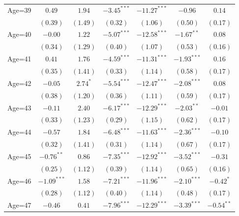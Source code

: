 \documentclass[fullpage]{paper}
\begin{document}
\begin{center}
\begin{longtable}{l c c c c c c }
Age=39      & $0.49$        & $1.94$        & $-3.45^{***}$  & $-11.27^{***}$ & $-0.96$       & $0.14$        \\
            & $(0.39)$      & $(1.49)$      & $(0.32)$       & $(1.06)$       & $(0.50)$      & $(0.17)$      \\
Age=40      & $-0.00$       & $1.22$        & $-5.07^{***}$  & $-12.58^{***}$ & $-1.67^{**}$  & $0.08$        \\
            & $(0.34)$      & $(1.29)$      & $(0.40)$       & $(1.07)$       & $(0.53)$      & $(0.16)$      \\
Age=41      & $0.41$        & $1.76$        & $-4.59^{***}$  & $-11.31^{***}$ & $-1.93^{***}$ & $0.16$        \\
            & $(0.35)$      & $(1.41)$      & $(0.33)$       & $(1.14)$       & $(0.58)$      & $(0.17)$      \\
Age=42      & $-0.05$       & $2.74^{*}$    & $-5.54^{***}$  & $-12.47^{***}$ & $-2.08^{***}$ & $0.08$        \\
            & $(0.38)$      & $(1.20)$      & $(0.36)$       & $(1.11)$       & $(0.59)$      & $(0.17)$      \\
Age=43      & $-0.11$       & $2.40$        & $-6.17^{***}$  & $-12.29^{***}$ & $-2.03^{**}$  & $-0.01$       \\
            & $(0.33)$      & $(1.23)$      & $(0.29)$       & $(1.15)$       & $(0.62)$      & $(0.17)$      \\
Age=44      & $-0.57$       & $1.84$        & $-6.48^{***}$  & $-11.63^{***}$ & $-2.36^{***}$ & $-0.10$       \\
            & $(0.32)$      & $(1.41)$      & $(0.31)$       & $(1.14)$       & $(0.67)$      & $(0.17)$      \\
Age=45      & $-0.76^{**}$  & $0.86$        & $-7.35^{***}$  & $-12.92^{***}$ & $-3.52^{***}$ & $-0.31$       \\
            & $(0.25)$      & $(1.12)$      & $(0.39)$       & $(1.14)$       & $(0.65)$      & $(0.16)$      \\
Age=46      & $-1.09^{***}$ & $1.58$        & $-7.21^{***}$  & $-11.96^{***}$ & $-2.10^{***}$ & $-0.42^{*}$   \\
            & $(0.28)$      & $(1.12)$      & $(0.40)$       & $(1.14)$       & $(0.48)$      & $(0.17)$      \\
Age=47      & $-0.46$       & $0.41$        & $-7.96^{***}$  & $-12.29^{***}$ & $-3.39^{***}$ & $-0.54^{**}$  \\

\end{longtable}
\end{center}
\end{document}
